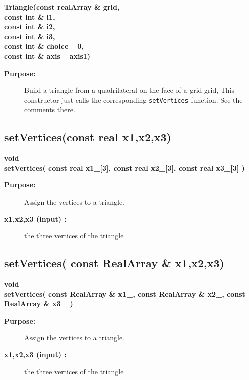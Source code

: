 \begin{flushleft} \textbf{%
\settowidth{\TriangleIncludeArgIndent}{Triangle(}%
Triangle(const realArray \& grid, \\ 
\hspace{\TriangleIncludeArgIndent}const int \& i1, \\ 
\hspace{\TriangleIncludeArgIndent}const int \& i2, \\ 
\hspace{\TriangleIncludeArgIndent}const int \& i3, \\ 
\hspace{\TriangleIncludeArgIndent}const int \& choice  =0,\\ 
\hspace{\TriangleIncludeArgIndent}const int \& axis  =axis1)
}\end{flushleft}
\begin{description}
\item[{\bf Purpose:}]  
    Build a triangle from a quadrilateral on the face of a grid grid, 
  This constructor just calls the corresponding {\tt setVertices} function.
  See the comments there.
\end{description}
\subsection{setVertices(const real x1,x2,x3)}
 
\begin{flushleft} \textbf{%
void  \\ 
\settowidth{\TriangleIncludeArgIndent}{setVertices(}%
setVertices( const real x1\_[3], const real x2\_[3], const real x3\_[3] )
}\end{flushleft}
\begin{description}
\item[{\bf Purpose:}]  Assign the vertices to a triangle.
\item[{\bf x1,x2,x3 (input) :}]  the three vertices of the triangle
\end{description}
\subsection{setVertices( const RealArray \& x1,x2,x3)}
 
\begin{flushleft} \textbf{%
void  \\ 
\settowidth{\TriangleIncludeArgIndent}{setVertices(}%
setVertices( const RealArray \& x1\_, const RealArray \& x2\_, const RealArray \& x3\_ )
}\end{flushleft}
\begin{description}
\item[{\bf Purpose:}]  Assign the vertices to a triangle.
\item[{\bf x1,x2,x3 (input) :}]  the three vertices of the triangle
\end{description}
